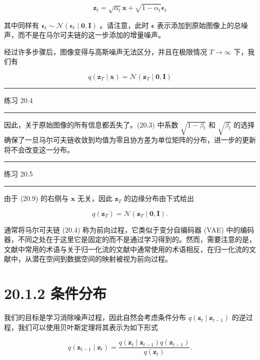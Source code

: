 \documentclass[10pt]{article}
\newcommand{\HRule}{\begin{center}\rule{0.9\linewidth}{0.2mm}\end{center}}
\begin{document}
\[
{\mathbf{z}}_{t} = \sqrt{{\alpha }_{t}}\mathbf{x} + \sqrt{1 - {\alpha }_{t}}{\mathbf{\epsilon }}_{t} \tag{20.8}
\]

其中同样有 \({\mathbf{\epsilon }}_{t} \sim  \mathcal{N}\left( {{\mathbf{\epsilon }}_{t} \mid  \mathbf{0},\mathbf{I}}\right)\) 。请注意，此时 \(\mathbf{\epsilon }\) 表示添加到原始图像上的总噪声，而不是在马尔可夫链的这一步添加的增量噪声。

经过许多步骤后，图像变得与高斯噪声无法区分，并且在极限情况 \(T \rightarrow  \infty\) 下，我们有

\[
q\left( {{\mathbf{z}}_{T} \mid  \mathbf{x}}\right)  = \mathcal{N}\left( {{\mathbf{z}}_{T} \mid  \mathbf{0},\mathbf{I}}\right)  \tag{20.9}
\]

\HRule

练习 20.4

\HRule

因此，关于原始图像的所有信息都丢失了。(20.3) 中系数 \(\sqrt{1 - {\beta }_{t}}\) 和 \(\sqrt{{\beta }_{t}}\) 的选择确保了一旦马尔可夫链收敛到均值为零且协方差为单位矩阵的分布，进一步的更新将不会改变这一分布。

\HRule

练习 20.5

\HRule

由于 (20.9) 的右侧与 \(\mathbf{x}\) 无关，因此 \({\mathbf{z}}_{T}\) 的边缘分布由下式给出

\[
q\left( {\mathbf{z}}_{T}\right)  = \mathcal{N}\left( {{\mathbf{z}}_{T} \mid  \mathbf{0},\mathbf{I}}\right) . \tag{20.10}
\]

通常将马尔可夫链 (20.4) 称为前向过程，它类似于变分自编码器 (VAE) 中的编码器，不同之处在于这里它是固定的而不是通过学习得到的。然而，需要注意的是，文献中常用的术语与关于归一化流的文献中通常使用的术语相反，在归一化流的文献中，从潜在空间到数据空间的映射被视为前向过程。

\section*{20.1.2 条件分布}

我们的目标是学习消除噪声过程，因此自然会考虑条件分布 \(q\left( {{\mathbf{z}}_{t} \mid  {\mathbf{z}}_{t - 1}}\right)\) 的逆过程，我们可以使用贝叶斯定理将其表示为如下形式

\[
q\left( {{\mathbf{z}}_{t - 1} \mid  {\mathbf{z}}_{t}}\right)  = \frac{q\left( {{\mathbf{z}}_{t} \mid  {\mathbf{z}}_{t - 1}}\right) q\left( {\mathbf{z}}_{t - 1}\right) }{q\left( {\mathbf{z}}_{t}\right) }. \tag{20.11}
\]
\end{document}
